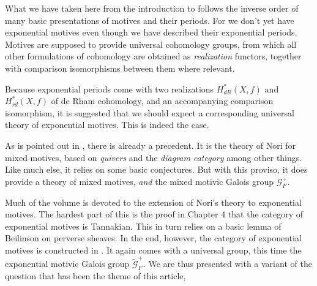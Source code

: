 \documentclass[preprint,12pt, leqno]{elsarticle}
\newcommand{\UGal}{\mathcal{G}_F}
\newcommand{\ubf}[1]{\textit{#1}}
\numberwithin{equation}{section}
\theoremstyle{named}
\begin{document}
What we have taken here from the introduction to \cite{FJ} follows the inverse order of many basic presentations of motives and their periods. For we don't yet have exponential motives even though we have described their exponential periods. Motives are supposed to provide universal cohomology groups, from which all other formulations of cohomology are obtained as \ubf{realization} functors, together with comparison isomorphisms between them where relevant.

Because exponential periods come with two realizations $H_{dR}^*(X, f)$ and $H_{rd}^*(X, f)$ of de Rham cohomology, and an accompanying comparison isomorphism, it is suggested that we should expect a corresponding universal theory of exponential motives. This is indeed the case.

As is pointed out in \cite{FJ}, there is already a precedent. It is the theory of Nori for mixed motives, based on \ubf{quivers} and the \ubf{diagram category} among other things. Like much else, it relies on some basic conjectures. But with this proviso, it does provide a theory of mixed motives, \ubf{and} the mixed motivic Galois group $\UGal^+$.

Much of the volume \cite{FJ} is devoted to the extension of Nori's theory to exponential motives. The hardest part of this is the proof in Chapter 4 that the category of exponential motives is Tannakian. This in turn relies on a basic lemma of Beilinson on perverse sheaves. In the end, however, the category of exponential motives is constructed in \cite{FJ}. It again comes with a universal group, this time the exponential motivic Galois group $\widetilde{\mathcal{G}}_F^+$. We are thus presented with a variant of the question that has been the theme of this article,  
\end{document}
